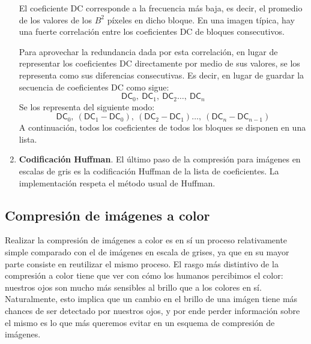\documentclass{article}
\begin{document}
\begin{enumerate}
  El coeficiente DC corresponde a la frecuencia más baja, es
  decir, el promedio de los valores de los $B^2$ píxeles en
  dicho bloque.
  En una imagen típica, hay una fuerte correlación entre los
  coeficientes DC de bloques consecutivos.

  Para aprovechar la redundancia dada por esta correlación,
  en lugar de representar los coeficientes DC directamente por
  medio de sus valores,
  se los representa como sus diferencias consecutivas.
  Es decir, en lugar de guardar la secuencia de coeficientes
  DC como sigue:
  \[
    \mathsf{DC}_0,\ \mathsf{DC}_1,\ \mathsf{DC}_2 \hdots,\ \mathsf{DC}_n
  \]
  Se los representa del siguiente modo:
  \[
    \mathsf{DC}_0,\ (\mathsf{DC}_1 - \mathsf{DC}_0),\ (\mathsf{DC}_2 - \mathsf{DC}_1) \hdots,\ (\mathsf{DC}_n - \mathsf{DC}_{n-1})
  \]
  A continuación, todos los coeficientes de todos los bloques
  se disponen en una lista.
\item
  {\bf Codificación Huffman}.
  El último paso de la compresión para imágenes en escalas de
  gris es la codificación Huffman de la lista de coeficientes.
  La implementación respeta el método usual de Huffman.
\end{enumerate}

\subsection{Compresión de imágenes a color}

Realizar la compresión de imágenes a color es en sí un proceso relativamente simple comparado con el de imágenes en escala de grises, ya que en su mayor parte consiste en reutilizar el mismo proceso. El rasgo más distintivo de la compresión a color tiene que ver con cómo los humanos percibimos el color: nuestros ojos son mucho más sensibles al brillo que a los colores en sí. Naturalmente, esto implica que un cambio en el brillo de una imágen tiene más chances de ser detectado por nuestros ojos, y por ende perder información sobre el mismo es lo que más queremos evitar en un esquema de compresión de imágenes.
\end{document}
